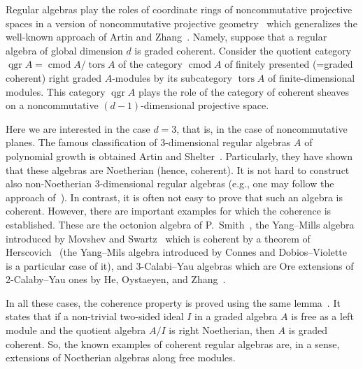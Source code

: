 \documentclass{amsart}
\numberwithin{equation}{section}
\theoremstyle{plain}
\theoremstyle{definition}
\begin{document}
 
Regular algebras play the roles of coordinate rings of noncommutative projective spaces 
in a version of noncommutative projective geometry~\cite{pol,BvdB} which generalizes 
the well-known approach of
Artin and Zhang~\cite{AZ}. Namely, suppose that a regular algebra of global dimension $d$ is graded coherent.
 Consider the quotient category ${\mathop{\mathrm{qgr}}\nolimits} A = {\mathop{\mathrm{cmod}}\nolimits} A / {\mathop{\mathrm{tors}}\nolimits} A$ 
 of the category  ${\mathop{\mathrm{cmod}}\nolimits} A$ of finitely
presented (=graded coherent)  right graded $A$-modules by its subcategory ${\mathop{\mathrm{tors}}\nolimits} A$ of finite-dimensional  modules.
This category  ${\mathop{\mathrm{qgr}}\nolimits} A $
plays the role 
of the category of coherent sheaves 
on a noncommutative $(d-1)$-dimensional projective space.

Here we are interested in the case $d=3$, that is, in the case of noncommutative planes. The famous classification of 3-dimensional regular  algebras $A$ of polynomial growth is obtained Artin and Shelter~\cite{AS}. Particularly, they have shown that these algebras  are Noetherian (hence, coherent). 
It is not hard to construct also non-Noetherian 3-dimensional regular algebras (e.g., one may follow the approach of~\cite[Sections~2 and~3]{AS}).
In contrast, it is often not easy to prove that such an algebra is coherent. 
However, there are important examples for which the coherence is established. These are the octonion algebra of P.~Smith~\cite{smi}, 
the Yang--Mills algebra introduced by Movshev and Swartz~\cite{ms} which is coherent by a theorem of Herscovich~\cite{hers} (the Yang--Mils algebra introduced by Connes and Dobios--Violette~\cite{cdv} is a particular case of it), and 3-Calabi--Yau algebras which are Ore extensions of 2-Calaby--Yau ones by He, Oystaeyen, and Zhang~\cite{hoz}. 

In all these cases, the coherence property is proved using the same 
lemma~\cite[Prop.~3.2]{Pi1}. It states that if a non-trivial two-sided ideal $I$ in a graded algebra $A$ is free as a left module and the quotient algebra $A/I$ is right Noetherian, then $A$ is graded coherent. 
So, the known examples of coherent regular algebras are, in a sense, extensions of Noetherian algebras along 
free modules. 
\end{document}
